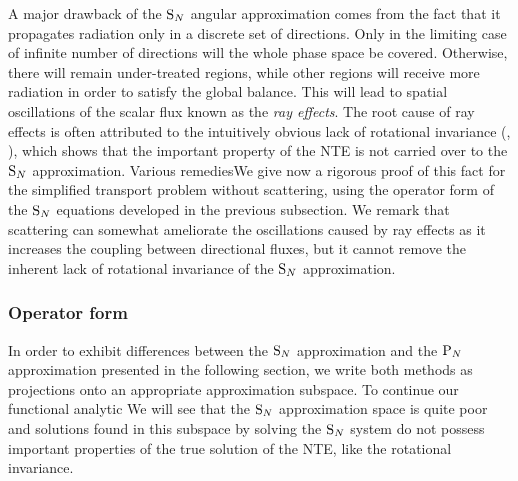 A major drawback of the $\text{S}_{N}$ angular approximation comes from the fact that it propagates radiation 
only in a discrete set of directions. Only in the limiting case of infinite number of directions will the
whole phase space be covered. Otherwise, there will remain under-treated regions, while other regions will receive more radiation in order
to satisfy the global balance. This will lead to spatial oscillations of the scalar flux  known as the \textit{ray
effects}. The root cause of ray effects is often attributed to the intuitively obvious lack of rotational invariance 
(\cite{Reuss}, \cite{Sanchez6}), which shows that the important property of the NTE is not carried over to the $\text{S}_{N}$
approximation. Various remediesWe give now a rigorous proof of this fact for the simplified transport problem without
scattering, using the operator form of the $\text{S}_{N}$ equations developed in the previous subsection. We remark that scattering can somewhat ameliorate the
 oscillations caused by ray effects as it increases the coupling between directional fluxes, but it cannot remove the
 inherent lack of rotational invariance of the $\text{S}_{N}$ approximation.

\subsubsection{Operator form}\label{sec:opsn}
In order to exhibit differences between the $\text{S}_{N}$ approximation and the $\text{P}_{N}$ approximation presented in the following
section, we write both methods as projections onto an appropriate approximation subspace. To continue our functional
analytic  We will see that the $\text{S}_{N}$ approximation space is quite poor and solutions found in this subspace by solving
the $\text{S}_{N}$ system do not possess important properties of the true solution of the NTE, like the rotational invariance. 

